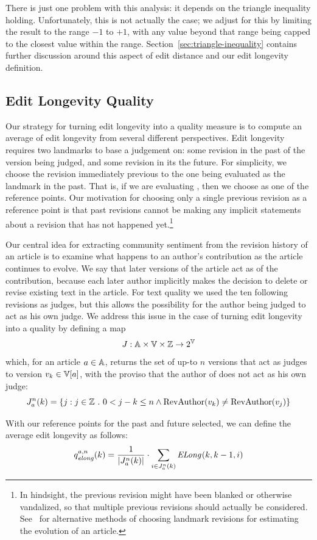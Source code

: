 There is just one problem with this analysis: it depends on
the triangle inequality holding.
Unfortunately, this is not actually the case; we adjust for
this by limiting the result to the range $-1$ to $+1$,
with any value beyond that range being capped to the closest
value within the range.
Section~\ref{sec:triangle-inequality} contains further discussion
around this aspect of edit distance and our edit longevity
definition.

\subsection{Edit Longevity Quality}

Our strategy for turning edit longevity into a quality measure
is to compute an average of edit longevity from several different
perspectives.
Edit longevity requires two landmarks to base a judgement on:
some revision in the past of the version being judged,
and some revision in its the future.
For simplicity, we choose the revision immediately previous to
the one being evaluated as the landmark in the past.
That is, if we are evaluating , then we choose
 as one of the reference points.
Our motivation for choosing only a single previous revision
as a reference point is that past revisions cannot be making
any implicit statements about a revision that has not happened
yet.\footnote{In hindsight, the previous revision might have been
blanked or otherwise vandalized, so that multiple previous revisions
should actually be considered.
See~\cite{Chatterjee2008} for alternative methods of choosing
landmark revisions for estimating the evolution of an article.}

Our central idea for extracting community sentiment from the
revision history of an article is to examine what happens to an
author's contribution as the article continues to evolve.
We say that later versions of the article act as 
of the contribution, because each later author implicitly makes
the decision to delete or revise existing text in the article.
For text quality we used the ten following revisions as judges,
but this allows the possibility for the author being judged
to act as his own judge.
We address this issue in the case of turning edit longevity into
a quality by defining a map
\begin{equation*}
J : \articles \times \versions{} \times \mathbb{Z} \to 2^\versions{}
\end{equation*}
which, for an article $a \in \mathbb{A}$,
returns the set of up-to $n$ versions that act as judges
to version $\version{k} \in \versions{a}$, with the proviso
that the author of  does not act as his own judge:
\begin{equation}
\judges{a}{n}{k} = \{ j : j \in \mathbb{Z}~.~0 < j - k \le n
    \wedge \revauthor{\version{k}} \ne \revauthor{\version{j}} \}
\label{def:judges}
\end{equation}

With our reference points for the past and future selected, we
can define the average edit longevity as follows:
\begin{equation}
\quality{elong}{a,n}{k} = \frac{1}{|\judges{a}{n}{k}|} \cdot
      \sum_{i \in \judges{a}{n}{k}} \esurv{}{k,k-1,i}
\label{def:elong}
\end{equation}

